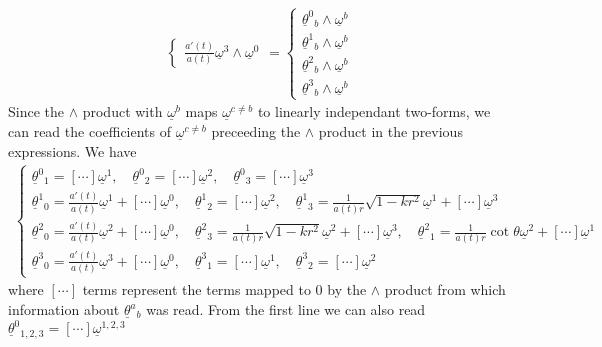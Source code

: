 \documentclass[10pt, a4paper]{article}
\begin{document}
{\begin{enumerate}
\begin{align*}
\begin{cases}
     \frac{a'(t)}{a(t)}\underline{\omega}^3 \wedge \underline{\omega}^0
    \end{cases} 
    = \begin{cases}
      \underline{\theta}^0{ }_b \wedge \underline{\omega}^b \\
      \underline{\theta}^1{ }_b \wedge \underline{\omega}^b \\
      \underline{\theta}^2{ }_b \wedge \underline{\omega}^b \\
      \underline{\theta}^3{ }_b \wedge \underline{\omega}^b 
    \end{cases}
  \end{align*}
  Since the $\wedge$ product with $\underline{\omega}^b$ maps $\underline{\omega}^{c\neq b}$ to linearly independant two-forms, we can read the coefficients of $\underline{\omega}^{c\neq b}$ preceeding the $\wedge$ product in the previous expressions. We have
  \begin{align*}
    \begin{cases}
    \underline{\theta}^0{ }_{1} =  [\cdots] \underline{\omega}^1, \quad \underline{\theta}^0{ }_{2} =  [\cdots] \underline{\omega}^2, \quad \underline{\theta}^0{ }_{3} =  [\cdots] \underline{\omega}^3\\
    \underline{\theta}^1{ }_0 = \frac{a'(t)}{a(t)}\underline{\omega}^1 + [\cdots] \underline{\omega}^0,\quad \underline{\theta}^1{ }_{2} = [\cdots] \underline{\omega}^2, \quad \underline{\theta}^1{ }_3 = \frac{1}{a(t)r}\sqrt{1-k r^2}\underline{\omega}^1 + [\cdots] \underline{\omega}^3\\
    \underline{\theta}^2{ }_0 = \frac{a'(t)}{a(t)}\underline{\omega}^2 + [\cdots]\underline{\omega}^0,\quad \underline{\theta}^2{ }_3 = \frac{1}{a(t)r}\sqrt{1-k r^2}\underline{\omega}^2 + [\cdots]\underline{\omega}^3,\quad \underline{\theta}^2{ }_1 = \frac{1}{a(t)r}\cot \theta \underline{\omega}^2 + [\cdots]\underline{\omega}^1\\
    \underline{\theta}^3{ }_0 = \frac{a'(t)}{a(t)}\underline{\omega}^3 + [\cdots]\underline{\omega}^0,\quad \underline{\theta}^3{ }_1 = [\cdots]\underline{\omega}^1, \quad \underline{\theta}^3{ }_2 = [\cdots]\underline{\omega}^2
    \end{cases}
  \end{align*} 
  where $[\cdots]$ terms represent the terms mapped to $0$ by the $\wedge$ product from which information about $\underline{\theta}^a{ }_b$ was read. From the first line we can also read $\underline{\theta}^0{ }_{1, 2, 3} = [\cdots] \underline{\omega}^{1, 2, 3}$
  

\end{enumerate}}
\end{document}
